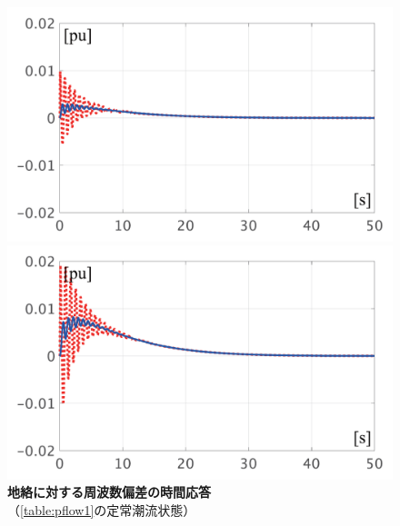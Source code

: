 \documentclass[tombow,dvipdfmx]{corona-a5-1.1}
\begin{document}
\begin{figure}[t]
  \centering
  {
  \begin{minipage}{0.49\linewidth}
    \centering
    \includegraphics[width = 1.0\linewidth]{figs/50mP1}
  \end{minipage}
  \begin{minipage}{0.49\linewidth}
    \centering
    \includegraphics[width = 1.0\linewidth]{figs/100mP1}
  \end{minipage}
  \medskip
  \caption{\textbf{地絡に対する周波数偏差の時間応答}
  \\ \centering （\ref{table:pflow1}の定常潮流状態）}
  \label{fig:P1fault}
  }
\medskip
\end{figure}
\end{document}
